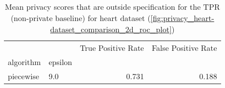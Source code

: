 \begin{table}[H]

    \begin{tabularx}{0.8\textwidth}{llrr}
        \toprule
                  &         & True Positive Rate & False Positive Rate \\
        algorithm & epsilon &                    &                     \\
        \midrule
        piecewise & 9.0     & 0.731              & 0.188               \\
        \bottomrule
    \end{tabularx}
    \caption{Mean privacy scores that are outside specification for the TPR (non-private baseline) for heart dataset (\ref{fig:privacy_heart-dataset_comparison_2d_roc_plot})}

\end{table}